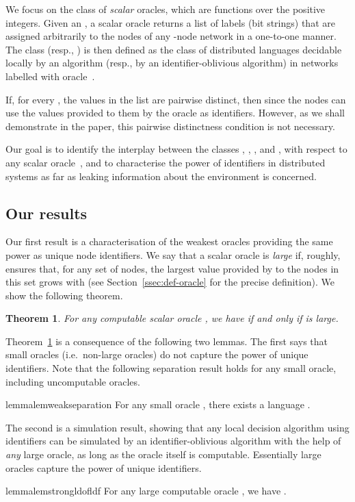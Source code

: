 \documentclass[11pt,a4paper]{article}
\newtheorem{theorem}{Theorem}
\theoremstyle{definition}
\theoremstyle{remark}
\begin{document}
We focus on the class of \emph{scalar} oracles, which are functions over the positive integers. Given an , a scalar oracle  returns a list  of  labels (bit strings) that are assigned arbitrarily to the nodes of any -node network in a one-to-one manner. The class  (resp., ) is then defined as the class of distributed languages  decidable locally by an algorithm (resp., by an identifier-oblivious algorithm) in networks labelled with oracle~.

If, for every , the  values in the list  are pairwise distinct, then  since the nodes can use the values provided to them by the oracle as identifiers. However, as we shall demonstrate in the paper, this pairwise distinctness condition is not necessary.

Our goal is to identify the interplay between the classes , , , and , with respect to any scalar oracle~, and to characterise  the power of identifiers in distributed systems as far as leaking information about the environment is concerned. 

\subsection{Our results}

Our first result is a characterisation of the weakest oracles providing the same power as unique node identifiers. We say that a scalar oracle  is \emph{large} if, roughly,  ensures that, for any set of  nodes, the largest value provided by  to the nodes in this set grows with  (see Section~\ref{ssec:def-oracle} for the precise definition). We show the following theorem.
\begin{theorem} \label{thm:main}
    For any computable scalar oracle , we have  if and only if  is large.
\end{theorem}

Theorem~\ref{thm:main} is a consequence of the following two lemmas. The first says that small oracles (i.e.\ non-large oracles) do not capture the power of unique identifiers. Note that the following separation result holds for any small oracle, including uncomputable oracles.
\begin{restatable}{lemma}{lemweakseparation} \label{lem:weak-separation}
    For any small oracle , there exists a language .
\end{restatable}
The second is a simulation result, showing that any local decision algorithm using identifiers can be simulated by an identifier-oblivious algorithm with the help of \emph{any} large oracle, as long as the oracle itself is computable. Essentially large oracles capture the power of unique identifiers.
\begin{restatable}{lemma}{lemstrongldofldf} \label{lem:strong-ldof-ldf}
    For any large computable oracle , we have .
\end{restatable}
\end{document}
